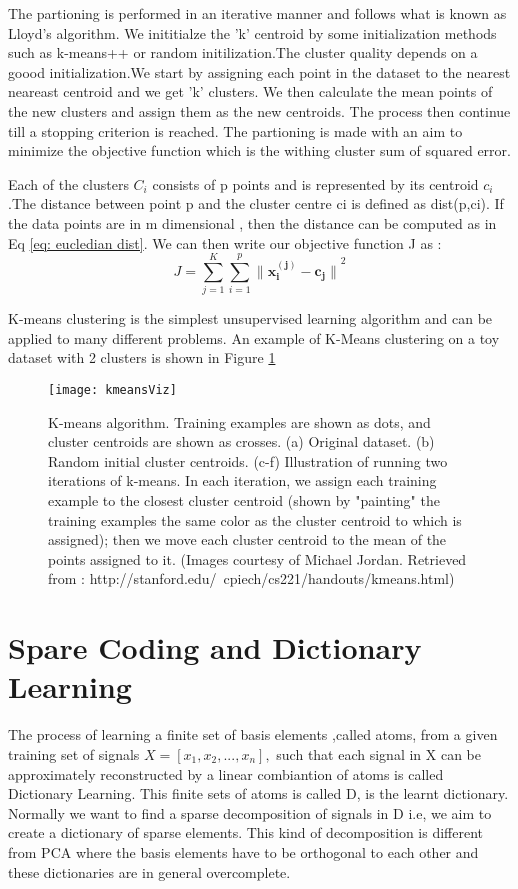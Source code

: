 The partioning is performed in an iterative manner and follows what is known as Lloyd's algorithm\cite{lloydsalgo}. We inititialze the 'k' centroid by some initialization methods such as k-means++ or random initilization.The cluster quality depends on a goood initialization.We start by assigning each point in the dataset to the nearest neareast centroid and we get 'k' clusters. We then calculate the mean points of the new clusters and assign them as the new centroids. The process then continue till a stopping criterion is reached. The partioning is made with an aim to minimize the objective function which is the withing cluster sum of squared error.

Each of the clusters $C_i$ consists of p points and is represented by its centroid $c_i$.The distance between point p and the cluster centre ci is defined as dist(p,ci). If the data points are in m dimensional , then the distance can be computed as in Eq \ref{eq: eucledian dist}. We can then write our objective function J as :
\begin{equation}
J = \sum\limits_{j=1}^{K} \sum\limits_{i=1}^{p} {\lVert\mathbf{x^{(j)}_i - c_j}  \rVert}^2
\end{equation}

K-means clustering is the simplest unsupervised learning algorithm and can be applied to many different problems. An example of K-Means clustering on a toy dataset with 2 clusters is shown in Figure \ref{fig:kmeansvisz}
\begin{figure}
	\centering
	\texttt{[image: kmeansViz]}
	\caption[K-Means Visualization]{ K-means algorithm. Training examples are shown as dots, and cluster centroids are shown as crosses. (a) Original dataset. (b) Random initial cluster centroids. (c-f) Illustration of running two iterations of k-means. In each iteration, we assign each training example to the closest cluster centroid (shown by "painting" the training examples the same color as the cluster centroid to which is assigned); then we move each cluster centroid to the mean of the points assigned to it. (Images courtesy of Michael Jordan. Retrieved from : http://stanford.edu/~cpiech/cs221/handouts/kmeans.html)}
	\label{fig:kmeansvisz}
\end{figure}

\section{Spare Coding and Dictionary Learning}
The process of learning a finite set of basis elements ,called atoms, from a given training set of signals $X=[x_1,x_2,...,x_n], $ such that each signal in X can be approximately reconstructed by a linear combiantion of atoms is called Dictionary Learning. This finite sets of atoms is called D, is the learnt dictionary. Normally we want to find a sparse decomposition of signals in D i.e, we aim to create a dictionary of sparse elements. This kind of decomposition is different from PCA where the basis elements have to be orthogonal to each other and these dictionaries are in general overcomplete.\\

